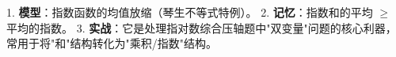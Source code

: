 \begin{summarybox}
1. \textbf{模型}：指数函数的均值放缩（琴生不等式特例）。
2. \textbf{记忆}：指数和的平均 $\geqslant$ 平均的指数。
3. \textbf{实战}：它是处理指对数综合压轴题中"双变量"问题的核心利器，常用于将"和"结构转化为"乘积/指数"结构。
\end{summarybox}